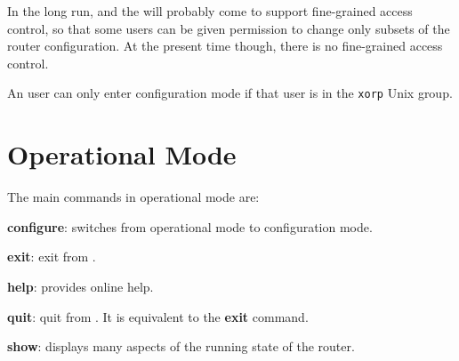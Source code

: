 In the long run, \xorpsh and the \rtrmgr will probably come to support
fine-grained access control, so that some users can be given
permission to change only subsets of the router configuration.  At the
present time though, there is no fine-grained access control.

An user can only enter configuration mode if that user is in the {\tt xorp}
Unix group.

\section{Operational Mode}
\noindent{}
\vspace{0.1in}

The main commands in operational mode are:
\begin{description}
\item{\bf configure}: switches from operational mode to configuration
mode.
\item{\bf exit}: exit from \xorpsh.
\item{\bf help}: provides online help.
\item{\bf quit}: quit from \xorpsh. It is equivalent to the {\bf exit}
command.
\item{\bf show}: displays many aspects of the running state of the
router.
\end{description}

\newpage
